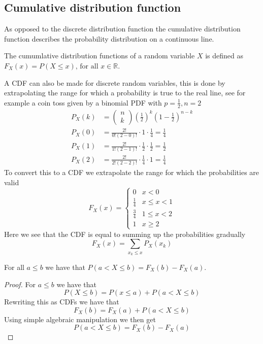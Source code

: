 \subsection{Cumulative distribution function}
As opposed to the discrete distribution function the cumulative distribution function describes the probability distribution on a continuous line.
\begin{definition}
  The cumumlative distribution functions of a random variable $X$ is defined as $F_{X}(x)=P(X\leq x)\text{, for all } x\in \mathbb{R}$.
\end{definition}
A CDF can also be made for discrete random variables, this is done by extrapolating the range for which a probability is true to the real line, see for example a coin toss given by a binomial PDF with $p=\frac{1}{2},n=2$
\begin{align*}
    P_{X}(k)&=\begin{pmatrix}n\\k\end{pmatrix}\left(\frac{1}{2}\right)^{k}\left(1-\frac{1}{2}\right)^{n-k} \\
    P_{X}(0)&=\frac{2!}{0!(2-0)!}\cdot 1\cdot\frac{1}{4}=\frac{1}{4} \\
    P_{X}(1)&=\frac{2!}{1!(2-1)!}\cdot\frac{1}{2}\cdot\frac{1}{2}=\frac{1}{2} \\
    P_{X}(2)&=\frac{2!}{2!(2-2)!}\cdot\frac{1}{4}\cdot 1=\frac{1}{4}
\end{align*}
To convert this to a CDF we extrapolate the range for which the probabilities are valid
\[
    F_{X}(x)=\begin{cases}0 & x<0 \\ \frac{1}{4} & x\leq x<1 \\ \frac{3}{4} & 1\leq x<2 \\ 1 & x\geq 2 \end{cases}
\]
Here we see that the CDF is equal to summing up the probabilities gradually
\[
    F_{X}(x)=\sum_{x_{k}\leq x}P_{X}(x_{k})
\]
\begin{theorem}
  For all $a\leq b$ we have that $P(a<X\leq b)=F_{X}(b)-F_{X}(a)$.
\end{theorem}
\begin{proof}
    For $a\leq b$ we have that
    \[
        P(X\leq b)=P(x\leq a)+P(a<X\leq b)
    \]
    Rewriting this as CDFs we have that
    \[
        F_{X}(b)=F_{X}(a)+P(a<X\leq b)
    \]
    Using simple algebraic manipulation we then get
    \[
        P(a<X\leq b)=F_{X}(b)-F_{X}(a)
    \]
\end{proof}
